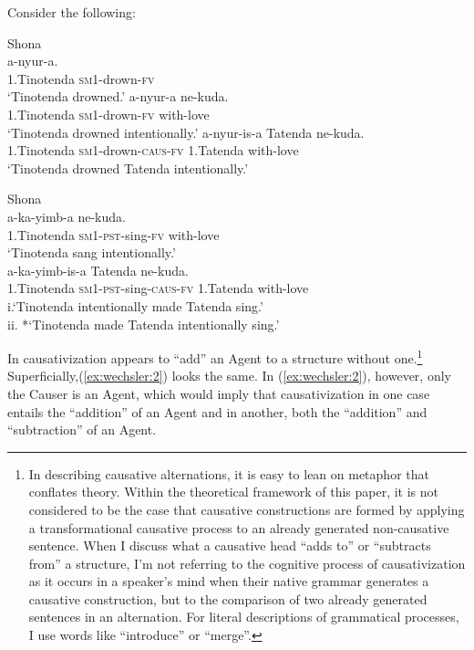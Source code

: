 \documentclass[output=paper,modfonts,nonflat,colorlinks,citecolor=brown]{langsci/langscibook}
\begin{document}
Consider the following:

\ea\label{ex:wechsler:1}
Shona\\
\ea\label{ex:wechsler:1a}  {a-nyur-a}.\\
1.Tinotenda \textsc{sm1-}drown\textsc{-fv}\\
\glt ‘Tinotenda drowned.’
\ex\label{ex:wechsler:1b}  {a-nyur-a} {ne-kuda}.\\
1.Tinotenda \textsc{sm1-}drown\textsc{-fv} with-love\\
\glt ‘Tinotenda drowned intentionally.’
\ex\label{ex:wechsler:1c}  {a-nyur-is-a} {Tatenda} {ne-kuda}.\\
1.Tinotenda \textsc{sm1-}drown\textsc{-caus-fv} {1.Tatenda} {with-love}\\
\glt ‘Tinotenda drowned Tatenda intentionally.’\\
\z
\z

\ea\label{ex:wechsler:2}
Shona\\
\ea\label{ex:wechsler:2a}  {a-ka-yimb-a} {ne-kuda}.\\
1.Tinotenda \textsc{sm1-pst-}sing\textsc{-fv} with-love\\
\glt ‘Tinotenda sang intentionally.’\\
\ex\label{ex:wechsler:2b}  {a-ka-yimb-is-a} {Tatenda} {ne-kuda}.\\
1.Tinotenda \textsc{sm1-pst-}sing\textsc{-caus-fv} 1.Tatenda with-love\\
\glt\label{ex:wechsler:2c} i.‘Tinotenda intentionally made Tatenda sing.’\\
ii. *‘Tinotenda made Tatenda intentionally sing.’
\z
\z

In  causativization appears to “add” an Agent to a structure without one.\footnote{In describing causative alternations, it is easy to lean on metaphor that conflates theory. Within the theoretical framework of this paper, it is not considered to be the case that causative constructions are formed by applying a transformational causative process to an already generated non-causative sentence. When I discuss what a causative head “adds to” or “subtracts from” a structure, I’m not referring to the cognitive process of causativization as it occurs in a speaker’s mind when their native grammar generates a causative construction, but to the comparison of two already generated sentences in an alternation. For literal descriptions of grammatical processes, I use words like “introduce” or “merge”.} Superficially,(\ref{ex:wechsler:2}) looks the same. In (\ref{ex:wechsler:2}), however, only the Causer is an Agent, which would imply that causativization in one case entails the “addition” of an Agent and in another, both the “addition” and “subtraction” of an Agent.
\end{document}
